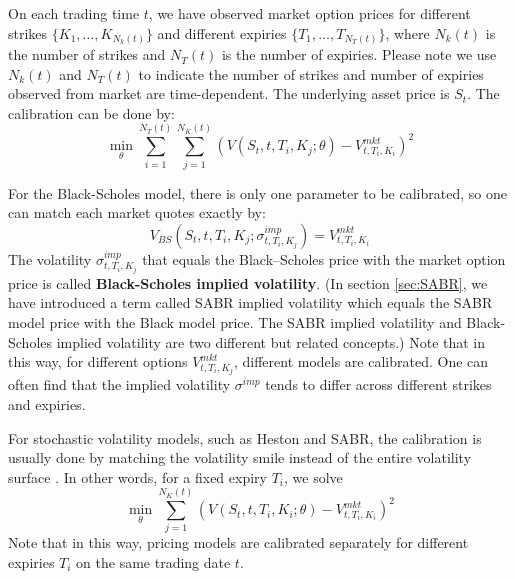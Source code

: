 \documentclass[letterpaper,12pt,titlepage,oneside,final]{book}
\numberwithin{equation}{section}
\theoremstyle{definition}
\newcommand{\Vmkt}{V^{mkt}}
\begin{document}
On each trading time $t$, we have observed market option prices for different strikes $\{K_1,\dots, K_{N_k(t)}\}$ and different expiries $\{T_1,\dots, T_{N_T(t)}\}$, where $N_k(t)$ is the number of strikes and $N_T(t)$ is the number of expiries.
Please note we use  $N_k(t)$ and $N_T(t)$ to indicate the number of strikes and number of expiries observed from market are time-dependent.
The underlying asset price is $S_t$. The calibration can be done by:
\[
\min_{\theta}   \sum_{i=1}^{N_T(t)}  \sum_{j=1}^{N_K(t)} \left(V(S_t,t,T_i,K_j;\theta)-\Vmkt_{t,T_i,K_i}\right)^2
\]


For the Black-Scholes model, there is only one parameter to be calibrated,
so  one can match each market quotes exactly by:
\[
V_{BS}(S_t,t,T_i,K_j;\sigma^{imp}_{t,T_i,K_j})=\Vmkt_{t,T_i,K_i}
\]
The volatility $\sigma^{imp}_{t,T_i,K_j}$ that equals the Black–Scholes price with the market option price is called \textbf{Black-Scholes implied volatility}. (In section \ref{sec:SABR}, we have introduced a term called SABR implied volatility which equals the SABR model price with the Black model price. The SABR implied volatility and  Black-Scholes implied volatility are two different but related concepts.)
Note that in this way, for different options $\Vmkt_{t,T_i,K_j}$, different models are calibrated.  One can often find that the implied volatility $\sigma^{imp}$ tends to differ across different strikes and expiries.

For stochastic volatility models, such as Heston and SABR, the calibration is usually done by matching the volatility smile instead of the entire volatility surface \cite{heston1993closed,hagan2002managing,hulloptimal}. In other words, for a fixed expiry $T_i$, we solve
\[
\min_{\theta} \sum_{j=1}^{N_K(t)} \left(V(S_t,t,T_i,K_i;\theta)-\Vmkt_{t,T_i,K_i}\right)^2
\]
Note that in this way, pricing models are calibrated separately for different expiries $T_i$  on the same trading date $t$.
\end{document}
